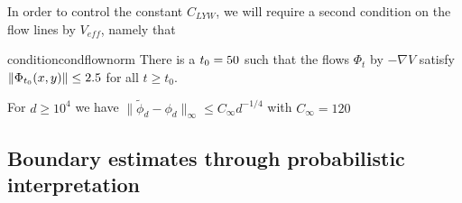 In order to control the constant $C_{LYW}$, we will require a second condition on the flow lines by $V_{eff}$, namely that

\begin{restatable}{condition}{condflownorm}
    \label{cond:coarse_flow}
    There is a $t_0 = 50$ such that the flows $\Phi_t$ by $-\nabla V$ satisfy
    $\|\Phi_{t_0}(x,y)\|\le 2.5$ for all $t\ge t_0$.
\end{restatable}

\begin{proposition}
    For $d\ge 10^4$ we have $\|\tilde \phi_d - \phi_d\|_\infty \le C_\infty d^{-1/4}$ with $C_\infty = 120$
\end{proposition}

\subsection{Boundary estimates through probabilistic interpretation}

